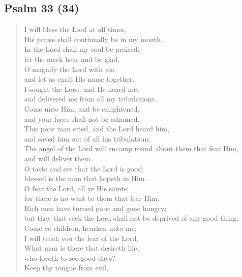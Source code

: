 {		\subsection*{Psalm 33 (34)}
			\begin{verse}
				I will bless the Lord at all times,\nolinebreak\\
				His praise shall continually be in my mouth.\nolinebreak\\
				In the Lord shall my soul be praised;\nolinebreak\\
				let the meek hear and be glad.\nolinebreak\\
				O magnify the Lord with me,\nolinebreak\\
				and let us exalt His name together.\nolinebreak\\
				I sought the Lord, and He heard me,\nolinebreak\\
				and delivered me from all my tribulations.\nolinebreak\\
				Come unto Him, and be enlightened,\nolinebreak\\
				and your faces shall not be ashamed.\nolinebreak\\
				This poor man cried, and the Lord heard him,\nolinebreak\\
				and saved him out of all his tribulations.\nolinebreak\\
				The angel of the Lord will encamp round about them that fear Him,\nolinebreak\\
				and will deliver them.\nolinebreak\\
				O taste and see that the Lord is good;\nolinebreak\\
				blessed is the man that hopeth in Him.\nolinebreak\\
				O fear the Lord, all ye His saints;\nolinebreak\\
				for there is no want to them that fear Him.\nolinebreak\\
				Rich men have turned poor and gone hungry;\nolinebreak\\
				but they that seek the Lord shall not be deprived of any good thing.\nolinebreak\\
				Come ye children, hearken unto me;\nolinebreak\\
				I will teach you the fear of the Lord.\nolinebreak\\
				What man is there that desireth life,\nolinebreak\\
				who loveth to see good days?\nolinebreak\\
				Keep thy tongue from evil,\nolinebreak\\

\end{verse}}
